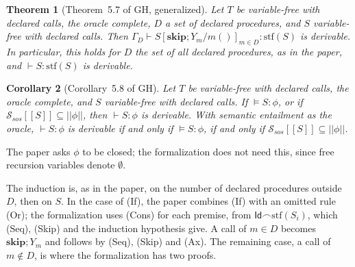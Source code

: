 \documentclass[11pt]{article}
\newcommand{\sem}[1]{[\![ #1 ]\!]}
\newcommand{\fsem}[1]{|\!|#1|\!|}
\newcommand{\Ssos}{{\mathcal{S}_{\mathit{sos}}}}
\newcommand{\chop}{\smallfrown}
\newcommand{\Id}{\mathsf{Id}}
\newcommand{\stf}{\mathrm{stf}}
\newcommand{\kw}[1]{\mathbf{#1}}
\newcommand{\skipS}{\kw{skip}}
\newcommand{\GH}[1]{#1 of GH}
\theoremstyle{plain}
\newtheorem{theorem}{Theorem}[section]
\newtheorem{corollary}[theorem]{Corollary}
\theoremstyle{definition}
\theoremstyle{remark}
\begin{document}
\begin{theorem}[\GH{Theorem~5.7}, generalized]\label{thm:canonical}
  Let $T$ be variable-free with declared calls, the oracle complete, $D$ a
  set of declared procedures, and $S$ variable-free with declared calls.
  Then $\Gamma_D \vdash S[\skipS;Y_m/m()]_{m \in D} : \stf(S)$ is
  derivable. In particular, this holds for $D$ the set of all declared
  procedures, as in the paper, and $\vdash S : \stf(S)$ is derivable.
\end{theorem}

\begin{corollary}[\GH{Corollary~5.8}]\label{cor:complete}
  Let $T$ be variable-free with declared calls, the oracle complete, and $S$
  variable-free with declared calls. If $\models S : \phi$, or if
  $\Ssos\sem{S} \subseteq \fsem{\phi}$, then $\vdash S : \phi$ is
  derivable. With semantic entailment as the oracle, $\vdash S : \phi$ is
  derivable if and only if $\models S : \phi$, if and only if $\Ssos\sem{S}
  \subseteq \fsem{\phi}$.
\end{corollary}

The paper asks $\phi$ to be closed; the formalization does not need this,
since free recursion variables denote $\emptyset$.

The induction is, as in the paper, on the number of declared procedures
outside $D$, then on $S$. In the case of (If), the paper combines (If) with
an omitted rule (Or); the formalization uses (Cons) for each premise,
from $\Id\chop\stf(S_i)$, which (Seq), (Skip) and the induction hypothesis
give. A call of $m \in D$ becomes $\skipS;Y_m$ and follows by (Seq), (Skip)
and (Ax). The remaining case, a call of $m \notin D$, is where the
formalization has two proofs.
\end{document}
